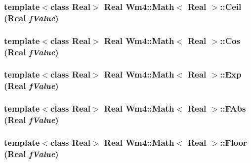 \subsubsection{\setlength{\rightskip}{0pt plus 5cm}template$<$class Real$>$ Real {\bf Wm4::Math}$<$ Real $>$::Ceil (Real {\em f\-Value})\hspace{0.3cm}{\tt  [static]}}\label{classWm4_1_1Math_3fb661e8ea601da33bd46a8c442bfe42}


\subsubsection{\setlength{\rightskip}{0pt plus 5cm}template$<$class Real$>$ Real {\bf Wm4::Math}$<$ Real $>$::Cos (Real {\em f\-Value})\hspace{0.3cm}{\tt  [static]}}\label{classWm4_1_1Math_fd6959dae9326beb85a9aa63715abe22}


\subsubsection{\setlength{\rightskip}{0pt plus 5cm}template$<$class Real$>$ Real {\bf Wm4::Math}$<$ Real $>$::Exp (Real {\em f\-Value})\hspace{0.3cm}{\tt  [static]}}\label{classWm4_1_1Math_6fe0f8b629d9101caf4f0048af3723be}


\subsubsection{\setlength{\rightskip}{0pt plus 5cm}template$<$class Real$>$ Real {\bf Wm4::Math}$<$ Real $>$::FAbs (Real {\em f\-Value})\hspace{0.3cm}{\tt  [static]}}\label{classWm4_1_1Math_4d05439576b1f7a51883e93ca5da8841}


\subsubsection{\setlength{\rightskip}{0pt plus 5cm}template$<$class Real$>$ Real {\bf Wm4::Math}$<$ Real $>$::Floor (Real {\em f\-Value})\hspace{0.3cm}{\tt  [static]}}\label{classWm4_1_1Math_8effc599055e9a3ddd6d51e8ab2f6ea7}


